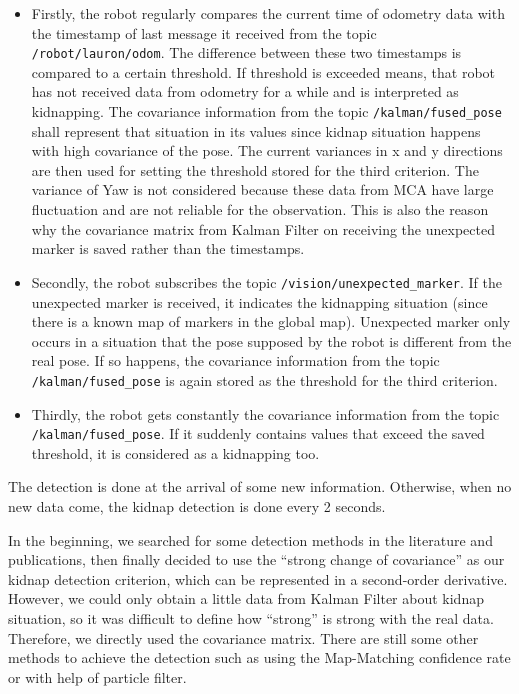 \begin{itemize}
\item Firstly, the robot regularly compares the current time of odometry data with the timestamp of last message it received from the topic \texttt{/robot/lauron/odom}. The difference between these two timestamps is compared to a certain threshold. If threshold is exceeded means, that robot has not received data from odometry for a while and is interpreted as kidnapping. The covariance information from the topic \texttt{/kalman/fused\_pose} shall represent that situation in its values since kidnap situation happens with high covariance of the pose. The current variances in x and y directions are then used for setting the threshold stored for the third criterion.
The variance of Yaw is not considered because these data from MCA have large fluctuation and are not reliable for the observation. This is also the reason why the covariance matrix from Kalman Filter on receiving the unexpected marker is saved rather than the timestamps.
\item Secondly, the robot subscribes the topic \texttt{/vision/unexpected\_marker}. If the unexpected marker is received, it indicates the kidnapping situation (since there is a known map of markers in the global map). Unexpected marker only occurs in a situation that the pose supposed by the robot is different from the real pose. If so happens, the covariance information from the topic \texttt{/kalman/fused\_pose} is again stored as the threshold for the third criterion.
\item Thirdly, the robot gets constantly the covariance information from the topic \texttt{/kalman/fused\_pose}. If it suddenly contains values that exceed the saved threshold, it is considered as a kidnapping too.
\end{itemize}

The detection is done at the arrival of some new information. Otherwise, when no new data come, the kidnap detection is done every 2 seconds.
 
In the beginning, we searched for some detection methods in the literature and publications, then finally decided to use the “strong change of covariance” as our kidnap detection criterion, which can be represented in a second-order derivative. However, we could only obtain a little data from Kalman Filter about kidnap situation, so it was difficult to define how “strong” is strong with the real data. Therefore, we directly used the covariance matrix. There are still some other methods to achieve the detection such as using the Map-Matching confidence rate or with help of particle filter.

